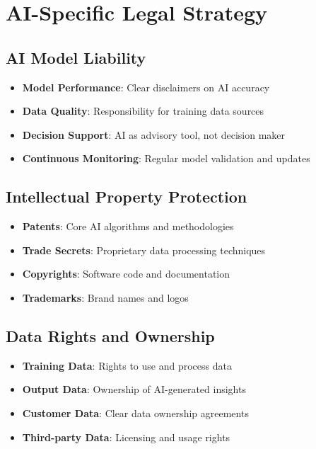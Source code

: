 \documentclass[business]{../templates/infraradar-main}
\begin{document}
\section{AI-Specific Legal Strategy}

\subsection{AI Model Liability}
\begin{itemize}
    \item \textbf{Model Performance}: Clear disclaimers on AI accuracy
    \item \textbf{Data Quality}: Responsibility for training data sources
    \item \textbf{Decision Support}: AI as advisory tool, not decision maker
    \item \textbf{Continuous Monitoring}: Regular model validation and updates
\end{itemize}

\subsection{Intellectual Property Protection}
\begin{itemize}
    \item \textbf{Patents}: Core AI algorithms and methodologies
    \item \textbf{Trade Secrets}: Proprietary data processing techniques
    \item \textbf{Copyrights}: Software code and documentation
    \item \textbf{Trademarks}: Brand names and logos
\end{itemize}

\subsection{Data Rights and Ownership}
\begin{itemize}
    \item \textbf{Training Data}: Rights to use and process data
    \item \textbf{Output Data}: Ownership of AI-generated insights
    \item \textbf{Customer Data}: Clear data ownership agreements
    \item \textbf{Third-party Data}: Licensing and usage rights
\end{itemize}
\end{document}
